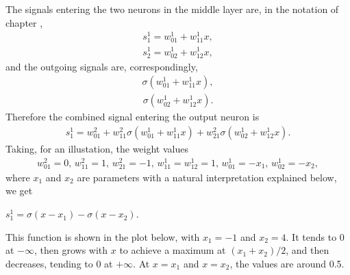\documentclass[letterpaper,10pt,english]{jupyterBook}
\begin{document}
\sphinxAtStartPar
The signals entering the two neurons in the middle layer are, in the notation of chapter {\hyperref[\detokenize{docs/more_layers:more-lab}]{}},
\begin{equation*}
\begin{split}s_1^{1}=w_{01}^{1}+w_{11}^{1} x, \end{split}
\end{equation*}\begin{equation*}
\begin{split}s_2^{1}=w_{02}^{1}+w_{12}^{1} x, \end{split}
\end{equation*}
\sphinxAtStartPar
and the outgoing signals are, correspondingly,
\begin{equation*}
\begin{split}\sigma \left( w_{01}^{1}+w_{11}^{1} x \right), \end{split}
\end{equation*}\begin{equation*}
\begin{split}\sigma \left( w_{02}^{1}+w_{12}^{1} x \right). \end{split}
\end{equation*}
\sphinxAtStartPar
Therefore the combined signal entering the output neuron is
\begin{equation*}
\begin{split}s_1^{1}=w_{01}^{2}+ w_{11}^{2}\sigma \left( w_{01}^{1}+w_{11}^{1} x \right)
+  w_{21}^{2}\sigma \left( w_{02}^{1}+w_{12}^{1} x \right). \end{split}
\end{equation*}
\sphinxAtStartPar
Taking, for an illustation, the weight values
\begin{equation*}
\begin{split}w_{01}^{2}=0, \, w_{11}^{2}=1, \, w_{21}^{2}=-1, \,
w_{11}^{1}=w_{12}^{1}=1, \, w_{01}^{1}=-x_1,  \, w_{02}^{1}=-x_2, \end{split}
\end{equation*}
\sphinxAtStartPar
where \(x_1\) and \(x_2\) are parameters with a natural interpretation explained below, we get

\sphinxAtStartPar
\(s_1^{1}=\sigma(x-x_1)-\sigma(x-x_2)\).

\sphinxAtStartPar
This function is shown in the plot below, with \(x_1=-1\) and \(x_2=4\).
It tends to 0 at \(- \infty\), then grows with \(x\) to achieve a maximum at
\((x_1+x_2)/2\), and then decreases, tending to 0 at \(+\infty\). At \(x=x_1\) and \(x=x_2\), the values are around 0.5.
\end{document}
